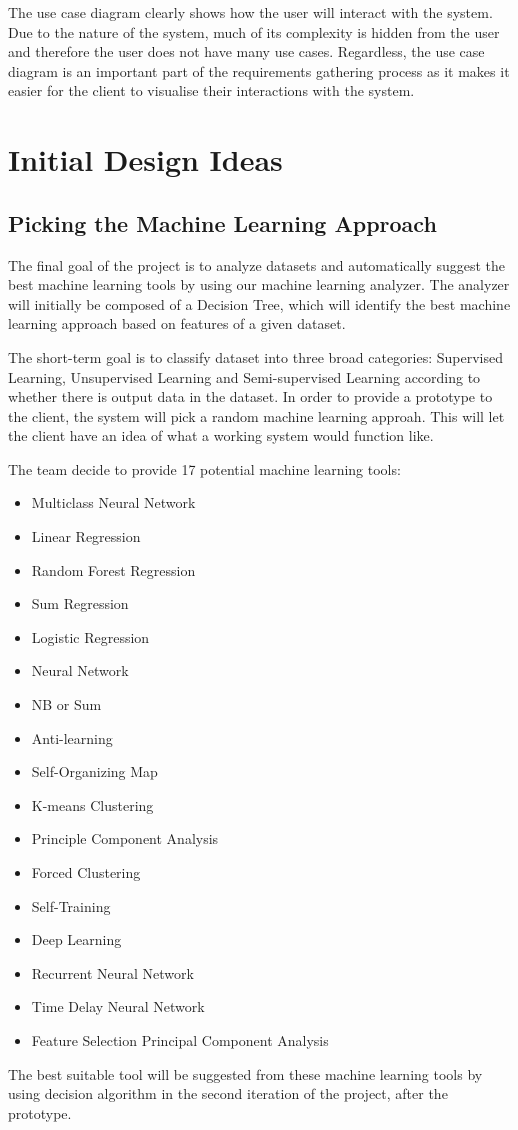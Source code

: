 \documentclass[titlepage]{article}
\begin{document}
The use case diagram clearly shows how the user will interact with the system. Due to the nature of the system, much of its complexity is hidden from the user and therefore the user does not have many use cases. Regardless, the use case diagram is an important part of the requirements gathering process as it makes it easier for the client to visualise their interactions with the system.

\section{Initial Design Ideas}
\subsection{Picking the Machine Learning Approach}
The final goal of the project is to analyze datasets and automatically suggest the best machine learning tools by using our machine learning analyzer. The analyzer will initially be composed of a Decision Tree, which will identify the best machine learning approach based on features of a given dataset.

The short-term goal is to classify dataset into three broad categories: Supervised Learning, Unsupervised Learning and Semi-supervised Learning according to whether there is output data in the dataset. In order to provide a prototype to the client, the system will pick a random machine learning approah. This will let the client have an idea of what a working system would function like.

The team decide to provide 17 potential machine learning tools:
\begin{itemize}
  \item Multiclass Neural Network
  \item Linear Regression
  \item Random Forest Regression
  \item Sum Regression
  \item Logistic Regression
  \item Neural Network
  \item NB or Sum
  \item Anti-learning
  \item Self-Organizing Map
  \item K-means Clustering
  \item Principle Component Analysis
  \item Forced Clustering
  \item Self-Training
  \item Deep Learning
  \item Recurrent Neural Network
  \item Time Delay Neural Network
  \item Feature Selection Principal Component Analysis
\end{itemize}
The best suitable tool will be suggested from these machine learning tools by using decision algorithm in the second iteration of the project, after the prototype.
\end{document}
